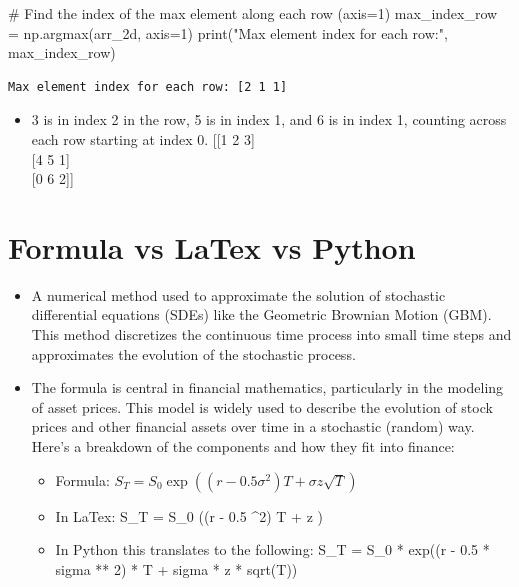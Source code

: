 \documentclass[
  letterpaper,
  DIV=11,
  numbers=noendperiod]{scrreprt}
\newenvironment{Shaded}{\begin{snugshade}}{\end{snugshade}}
\newcommand{\BuiltInTok}[1]{\textcolor[rgb]{0.00,0.23,0.31}{#1}}
\newcommand{\CommentTok}[1]{\textcolor[rgb]{0.37,0.37,0.37}{#1}}
\newcommand{\DecValTok}[1]{\textcolor[rgb]{0.68,0.00,0.00}{#1}}
\newcommand{\NormalTok}[1]{\textcolor[rgb]{0.00,0.23,0.31}{#1}}
\newcommand{\OperatorTok}[1]{\textcolor[rgb]{0.37,0.37,0.37}{#1}}
\newcommand{\StringTok}[1]{\textcolor[rgb]{0.13,0.47,0.30}{#1}}
\providecommand{\tightlist}{%
  \setlength{\itemsep}{0pt}\setlength{\parskip}{0pt}}\usepackage{longtable,booktabs,array}
\begin{document}
\begin{Shaded}
\begin{Highlighting}[]
\CommentTok{\# Find the index of the max element along each row (axis=1)}
\NormalTok{max\_index\_row }\OperatorTok{=}\NormalTok{ np.argmax(arr\_2d, axis}\OperatorTok{=}\DecValTok{1}\NormalTok{)}
\BuiltInTok{print}\NormalTok{(}\StringTok{"Max element index for each row:"}\NormalTok{, max\_index\_row)}
\end{Highlighting}
\end{Shaded}

\begin{verbatim}
Max element index for each row: [2 1 1]
\end{verbatim}

\begin{itemize}
\tightlist
\item
  3 is in index 2 in the row, 5 is in index 1, and 6 is in index 1,
  counting across each row starting at index 0. {[}{[}1 2 3{]}\\
  {[}4 5 1{]}\\
  {[}0 6 2{]}{]}
\end{itemize}


\chapter{Formula vs LaTex vs Python}\label{formula-vs-latex-vs-python}

\begin{itemize}
\tightlist
\item
  A numerical method used to approximate the solution of stochastic
  differential equations (SDEs) like the Geometric Brownian Motion
  (GBM). This method discretizes the continuous time process into small
  time steps and approximates the evolution of the stochastic process.
\item
  The formula is central in financial mathematics, particularly in the
  modeling of asset prices. This model is widely used to describe the
  evolution of stock prices and other financial assets over time in a
  stochastic (random) way. Here's a breakdown of the components and how
  they fit into finance:

  \begin{itemize}
  \tightlist
  \item
    Formula:
    \(S_T = S_0 \exp((r - 0.5 \sigma^2) T + \sigma z \sqrt{T})\)
  \item
    In LaTex: S\_T = S\_0 \exp((r - 0.5 \sigma\^{}2) T + \sigma z
    )
  \item
    In Python this translates to the following: S\_T = S\_0 * exp((r -
    0.5 * sigma ** 2) * T + sigma * z * sqrt(T))
  \end{itemize}
\end{itemize}
\end{document}
